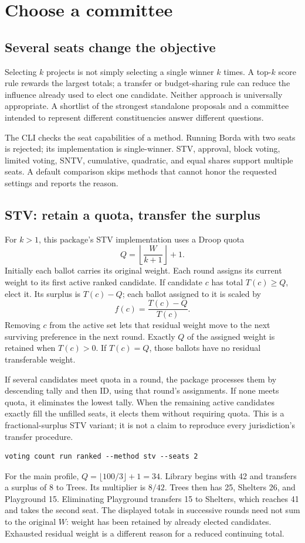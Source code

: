 \chapter{Choose a committee}
\label{chap:committees}
\section{Several seats change the objective}
Selecting $k$ projects is not simply selecting a single winner $k$ times. A top-$k$ score rule rewards the largest totals; a transfer or budget-sharing rule can reduce the influence already used to elect one candidate. Neither approach is universally appropriate. A shortlist of the strongest standalone proposals and a committee intended to represent different constituencies answer different questions.

The CLI checks the seat capabilities of a method. Running Borda with two seats is rejected; its implementation is single-winner. STV, approval, block voting, limited voting, SNTV, cumulative, quadratic, and equal shares support multiple seats. A default comparison skips methods that cannot honor the requested settings and reports the reason.

\section{STV: retain a quota, transfer the surplus}
For $k>1$, this package's STV implementation uses a Droop quota
\[
Q=\left\lfloor\frac{W}{k+1}\right\rfloor+1.
\]
Initially each ballot carries its original weight. Each round assigns its current weight to its first active ranked candidate. If candidate $c$ has total $T(c)\geq Q$, elect it. Its surplus is $T(c)-Q$; each ballot assigned to it is scaled by
\[
f(c)=\frac{T(c)-Q}{T(c)}.
\]
Removing $c$ from the active set lets that residual weight move to the next surviving preference in the next round. Exactly $Q$ of the assigned weight is retained when $T(c)>0$. If $T(c)=Q$, those ballots have no residual transferable weight.

If several candidates meet quota in a round, the package processes them by descending tally and then ID, using that round's assignments. If none meets quota, it eliminates the lowest tally. When the remaining active candidates exactly fill the unfilled seats, it elects them without requiring quota. This is a fractional-surplus STV variant; it is not a claim to reproduce every jurisdiction's transfer procedure.
\begin{lstlisting}[style=votingrun]
voting count run ranked --method stv --seats 2
\end{lstlisting}
For the main profile, $Q=\lfloor100/3\rfloor+1=34$. Library begins with 42 and transfers a surplus of 8 to Trees. Its multiplier is $8/42$. Trees then has 25, Shelters 26, and Playground 15. Eliminating Playground transfers 15 to Shelters, which reaches 41 and takes the second seat.
The displayed totals in successive rounds need not sum to the original $W$: weight has been retained by already elected candidates. Exhausted residual weight is a different reason for a reduced continuing total.

